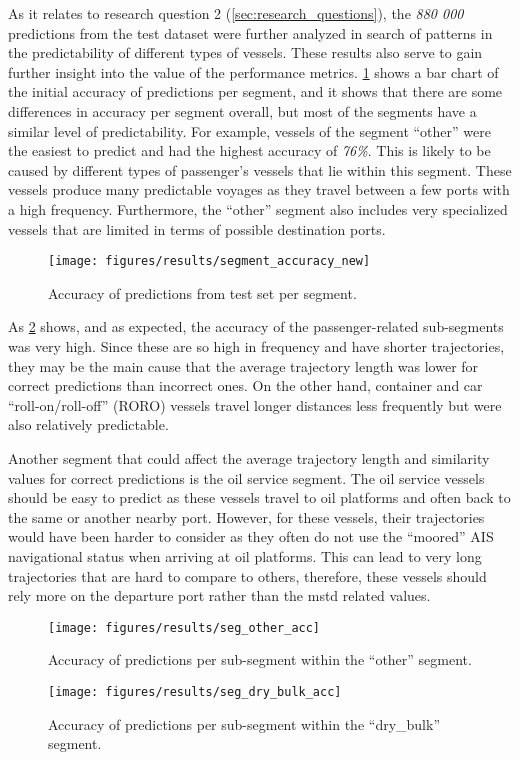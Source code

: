 As it relates to research question 2 (\cref{sec:research_questions}), the \textit{880 000} predictions from the test dataset were further analyzed in search of patterns in the predictability of different types of vessels. These results also serve to gain further insight into the value of the performance metrics. \cref{fig:segment_accuracy} shows a bar chart of the initial accuracy of predictions per segment, and it shows that there are some differences in accuracy per segment overall, but most of the segments have a similar level of predictability. For example, vessels of the segment ``other'' were the easiest to predict and had the highest accuracy of \textit{76\%}. This is likely to be caused by different types of passenger's vessels that lie within this segment. These vessels produce many predictable voyages as they travel between a few ports with a high frequency. Furthermore, the ``other'' segment also includes very specialized vessels that are limited in terms of possible destination ports.

\begin{figure}[htbp]
    \centering
    \texttt{[image: figures/results/segment\_accuracy\_new]}
    \caption{Accuracy of predictions from test set per segment.}
    \label{fig:segment_accuracy}
\end{figure}

As \cref{fig:other_accuracy} shows, and as expected, the accuracy of the passenger-related sub-segments was very high. Since these are so high in frequency and have shorter trajectories, they may be the main cause that the average trajectory length was lower for correct predictions than incorrect ones. On the other hand, container and car ``roll-on/roll-off'' (RORO) vessels travel longer distances less frequently but were also relatively predictable.

Another segment that could affect the average trajectory length and similarity values for correct predictions is the oil service segment. The oil service vessels should be easy to predict as these vessels travel to oil platforms and often back to the same or another nearby port. However, for these vessels, their trajectories would have been harder to consider as they often do not use the ``moored'' AIS navigational status when arriving at oil platforms. This can lead to very long trajectories that are hard to compare to others, therefore, these vessels should rely more on the departure port rather than the \acrshort{mstd} related values.

\begin{figure}[htbp]
    \centering
    \texttt{[image: figures/results/seg\_other\_acc]}
    \caption{Accuracy of predictions per sub-segment within the ``other'' segment.}
    \label{fig:other_accuracy}
\end{figure}
\begin{figure}[htbp]
    \centering
    \texttt{[image: figures/results/seg\_dry\_bulk\_acc]}
    \caption{Accuracy of predictions per sub-segment within the ``dry\_bulk'' segment.}
    \label{fig:dry_bulk_accuracy}
\end{figure}


